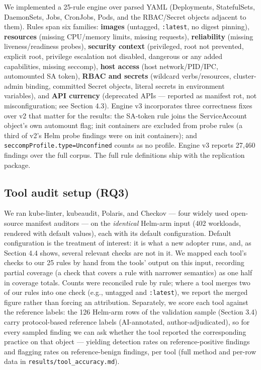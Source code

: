 \documentclass[pdflatex,sn-basic]{sn-jnl}
\begin{document}
We implemented a 25-rule engine over parsed YAML (Deployments,
StatefulSets, DaemonSets, Jobs, CronJobs, Pods, and the RBAC/Secret
objects adjacent to them). Rules span six families: \textbf{images}
(untagged, \texttt{:latest}, no digest pinning), \textbf{resources}
(missing CPU/memory limits, missing requests), \textbf{reliability}
(missing liveness/readiness probes), \textbf{security context}
(privileged, root not prevented, explicit root, privilege escalation not
disabled, dangerous or any added capabilities, missing seccomp),
\textbf{host access} (host network/PID/IPC, automounted SA token),
\textbf{RBAC and secrets} (wildcard verbs/resources, cluster-admin
binding, committed Secret objects, literal secrets in environment
variables), and \textbf{API currency} (deprecated APIs --- reported as
manifest rot, not misconfiguration; see Section 4.3). Engine v3
incorporates three correctness fixes over v2 that matter for the
results: the SA-token rule joins the ServiceAccount object's own
automount flag; init containers are excluded from probe rules (a third
of v2's Helm probe findings were on init containers); and
\texttt{seccompProfile.type=Unconfined} counts as no profile. Engine v3
reports 27,460 findings over the full corpus. The full rule definitions
ship with the replication package.

\hypertarget{tool-audit-setup-rq3}{%
\subsection{Tool audit setup (RQ3)}\label{tool-audit-setup-rq3}}

We ran kube-linter, kubeaudit, Polaris, and Checkov --- four widely used
open-source manifest auditors --- on the \emph{identical}
Helm-arm input (402 workloads, rendered with default values), each with
its default configuration. Default configuration is the treatment of
interest: it is what a new adopter runs, and, as Section 4.4 shows,
several relevant checks are not in it. We mapped each tool's checks to
our 25 rules by hand from the tools' output on this input, recording
partial coverage (a check that covers a rule with narrower semantics) as
one half in coverage totals. Counts were reconciled rule by rule; where
a tool merges two of our rules into one check (e.g., untagged and
\texttt{:latest}), we report the merged figure rather than forcing an
attribution. Separately, we score each tool against the reference
labels: the 126 Helm-arm rows of the validation sample (Section 3.4)
carry protocol-based reference labels (AI-annotated, author-adjudicated),
so for every sampled finding we can ask whether
the tool reported the corresponding practice on that object --- yielding
detection rates on reference-positive findings and flagging rates on
reference-benign findings, per tool (full method and per-row data in
\texttt{results/tool\_accuracy.md}).
\end{document}
